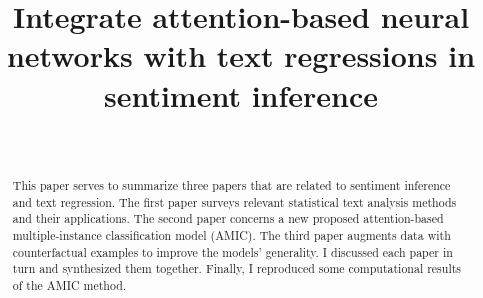 \documentclass[aoas]{imsart}
\numberwithin{equation}{section}
\theoremstyle{plain}
\theoremstyle{remark}
\begin{document}
\begin{frontmatter}
\title{Integrate attention-based neural networks with text regressions in sentiment inference}

\begin{aug}
\author[A]{~}
\address[A]{Department of Statistical Science, Southern Methodist University}
\end{aug}

\begin{abstract}
This paper serves to summarize three papers that are related to sentiment inference and text regression. The first paper surveys relevant statistical text analysis methods and their applications. The second paper concerns a new proposed attention-based multiple-instance classification model (AMIC). The third paper augments data with counterfactual examples to improve the models' generality. I discussed each paper in turn and synthesized them together. Finally, I reproduced some computational results of the AMIC method. 
\end{abstract}

\begin{keyword}
\end{keyword}

\end{frontmatter}
\end{document}
